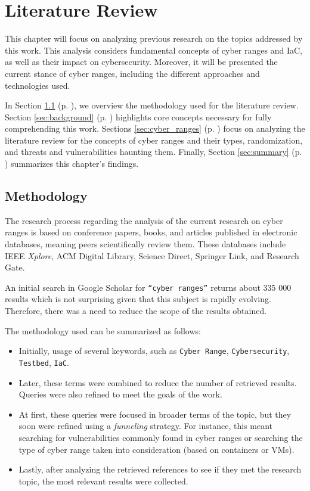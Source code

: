\chapter{Literature Review} \label{chap:sota}

\minitoc

This chapter will focus on analyzing previous research on the topics addressed by this work. This analysis considers fundamental concepts of cyber ranges and IaC, as well as their impact on cybersecurity. Moreover, it will be presented the current stance of cyber ranges, including the different approaches and technologies used.

In Section \ref{sec:methodology} (p. \pageref{sec:methodology}), we overview the methodology used for the literature review. Section \ref{sec:background} (p. \pageref{sec:background}) highlights core concepts necessary for fully comprehending this work. Sections \ref{sec:cyber_ranges} (p. \pageref{sec:cyber_ranges}) focus on analyzing the literature review for the concepts of cyber ranges and their types, randomization, and threats and vulnerabilities haunting them. Finally, Section \ref{sec:summary} (p. \pageref{sec:summary}) summarizes this chapter's findings.

\section{Methodology} \label{sec:methodology}

The research process regarding the analysis of the current research on cyber ranges is based on conference papers, books, and articles published in electronic databases, meaning peers scientifically review them. These databases include IEEE \textit{Xplore}, ACM Digital Library, Science Direct, Springer Link, and Research Gate.

An initial search in Google Scholar for \texttt{``cyber ranges''} returns about 335 000 results which is not surprising given that this subject is rapidly evolving. Therefore, there was a need to reduce the scope of the results obtained.

The methodology used can be summarized as follows:

\begin{itemize}
    \item Initially, usage of several keywords, such as \texttt{Cyber Range}, \texttt{Cybersecurity}, \texttt{Testbed}, \texttt{IaC}.
    \item Later, these terms were combined to reduce the number of retrieved results. Queries were also refined to meet the goals of the work.
    \item At first, these queries were focused in broader terms of the topic, but they soon were refined using a \textit{funneling} strategy. For instance, this meant searching for vulnerabilities commonly found in cyber ranges or searching the type of cyber range taken into consideration (based on containers or VMs).
    \item Lastly, after analyzing the retrieved references to see if they met the research topic, the most relevant results were collected.
\end{itemize}

